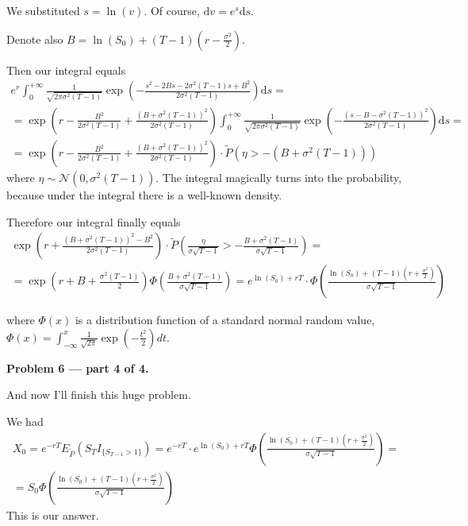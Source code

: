 \documentclass[12pt, a4paper]{article}
\newcommand{\dt}{dt}
\newcommand{\dv}{\mathrm{d}v}
\begin{document}
We substituted $s = \ln(v)$. Of course, $\dv = e^{s}\mathrm{d}s$.\par
Denote also $B = \ln(S_{0}) + (T-1)\left(r - \frac{ \sigma^{2}}{ 2}\right)$.\par
Then our integral equals
\begin{multline}
e^{r}\int_0^{+\infty} \frac{ 1}{ \sqrt{2\pi\sigma^{2} (T-1)}}\exp\left(-\frac{ s^{2} - 2Bs - 2\sigma^{2}(T-1)s + B^{2}}{ 2\sigma^{2}(T-1)}\right)\mathrm{d}s = \\
= \exp\left(r - \frac{ B^{2}}{ 2\sigma^{2}(T-1)} + \frac{ \left(B + \sigma^{2}(T-1)\right)^{2}}{ 2\sigma^{2}(T-1)}\right)\int_0^{+\infty} \frac{ 1}{ \sqrt{2\pi\sigma^{2} (T-1)}}\exp\left(-\frac{ \left(s - B - \sigma^{2}(T-1)\right)^{2}}{ 2\sigma^{2}(T-1)}\right)\mathrm{d}s = \\
= \exp\left(r - \frac{ B^{2}}{ 2\sigma^{2}(T-1)} + \frac{ \left(B + \sigma^{2}(T-1)\right)^{2}}{ 2\sigma^{2}(T-1)}\right) \cdot \tilde{P}\left(\eta > -\left(B + \sigma^{2}(T-1)\right)\right)
\end{multline}
where $\eta \sim \mathcal{N}(0, \sigma^{2}(T-1))$. The integral magically turns into the probability, because under the integral there is a well-known density.


Therefore our integral finally equals
\begin{multline}
 \exp\left(r + \frac{ \left(B + \sigma^{2}(T-1)\right)^{2} - B^{2}}{ 2\sigma^{2}(T-1)}\right)\cdot \tilde{P}\left(\frac{ \eta}{ \sigma\sqrt{T-1}} > -\frac{ B + \sigma^{2}(T-1)}{ \sigma\sqrt{T-1}}\right) = \\
=
\exp\left(r + B + \frac{ \sigma^{2}(T-1)}{ 2}\right)\Phi\left(\frac{ B + \sigma^{2}(T-1)}{ \sigma\sqrt{T-1}}\right) = e^{\ln(S_{0}) + rT}\cdot\Phi\left(\frac{ \ln(S_{0}) + (T-1)\left(r + \frac{ \sigma^{2}}{ 2}\right)}{ \sigma\sqrt{T-1}}\right)
\end{multline}

where $\Phi(x)$ is a distribution function of  a standard normal random value, $\Phi(x) = \int_{-\infty}^{x}\frac{ 1}{ \sqrt{2\pi}}\exp\left(-\frac{ t^{2}}{ 2}\right)\dt$.


\textbf{Problem 6 — part 4 of 4.}\par
And now I'll finish this huge problem.\par
We had
\begin{multline}
X_0 = e^{-rT}E_{\tilde{P}}\left(S_{T}I_{\{S_{T-1}> 1\}}\right) = e^{-rT}\cdot e^{\ln(S_{0}) + rT}\Phi\left(\frac{ \ln(S_{0}) + (T-1)\left(r + \frac{ \sigma^{2}}{ 2}\right)}{ \sigma\sqrt{T-1}}\right) = \\
=
S_{0}\Phi\left(\frac{ \ln(S_{0}) + (T-1)\left(r + \frac{ \sigma^{2}}{ 2}\right)}{ \sigma\sqrt{T-1}}\right)
\end{multline}
This is our answer.
\end{document}
